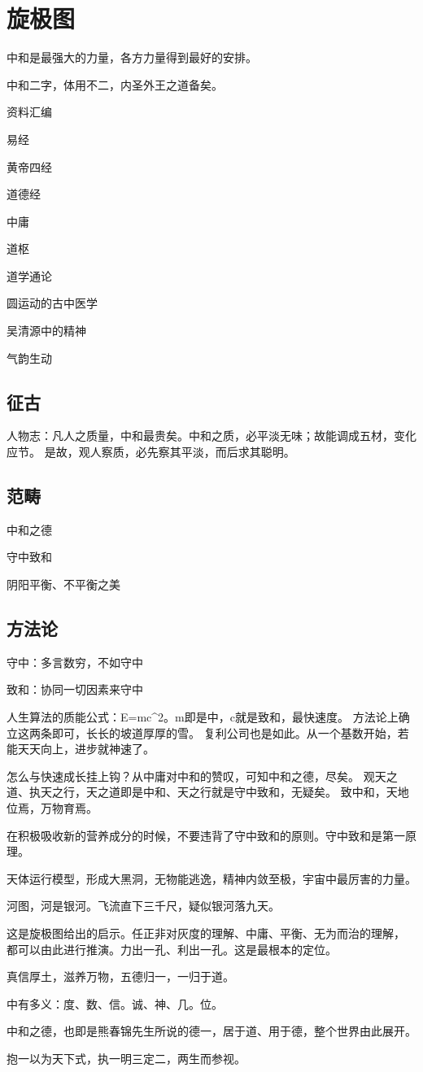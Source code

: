 \chapter{旋极图}

中和是最强大的力量，各方力量得到最好的安排。

中和二字，体用不二，内圣外王之道备矣。

资料汇编
\begin{enumbox}
\item 易经
\item 黄帝四经
\item 道德经
\item 中庸
\item 道枢
\item 道学通论
\item 圆运动的古中医学
\item 吴清源中的精神
\item 气韵生动
\end{enumbox}

\section{征古}

人物志：凡人之质量，中和最贵矣。中和之质，必平淡无味；故能调成五材，变化应节。
是故，观人察质，必先察其平淡，而后求其聪明。

\section{范畴}

中和之德

守中致和

阴阳平衡、不平衡之美

\section{方法论}

守中：多言数穷，不如守中

致和：协同一切因素来守中

人生算法的质能公式：E=mc^2。m即是中，c就是致和，最快速度。
方法论上确立这两条即可，长长的坡道厚厚的雪。
复利公司也是如此。从一个基数开始，若能天天向上，进步就神速了。

怎么与快速成长挂上钩？从中庸对中和的赞叹，可知中和之德，尽矣。
观天之道、执天之行，天之道即是中和、天之行就是守中致和，无疑矣。
致中和，天地位焉，万物育焉。

在积极吸收新的营养成分的时候，不要违背了守中致和的原则。守中致和是第一原理。

天体运行模型，形成大黑洞，无物能逃逸，精神内敛至极，宇宙中最厉害的力量。

河图，河是银河。飞流直下三千尺，疑似银河落九天。

这是旋极图给出的启示。任正非对灰度的理解、中庸、平衡、无为而治的理解，
都可以由此进行推演。力出一孔、利出一孔。这是最根本的定位。

真信厚土，滋养万物，五德归一，一归于道。

中有多义：度、数、信。诚、神、几。位。

中和之德，也即是熊春锦先生所说的德一，居于道、用于德，整个世界由此展开。

抱一以为天下式，执一明三定二，两生而参视。
